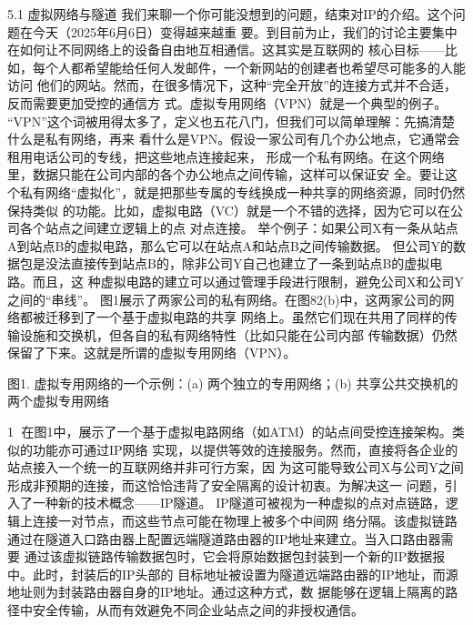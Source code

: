 
5.1 虚拟网络与隧道
我们来聊一个你可能没想到的问题，结束对IP的介绍。这个问题在今天（2025年6月6日）变得越来越重
要。到目前为止，我们的讨论主要集中在如何让不同网络上的设备自由地互相通信。这其实是互联网的
核心目标——比如，每个人都希望能给任何人发邮件，一个新网站的创建者也希望尽可能多的人能访问
他们的网站。然而，在很多情况下，这种“完全开放”的连接方式并不合适，反而需要更加受控的通信方
式。虚拟专用网络（VPN）就是一个典型的例子。
“VPN”这个词被用得太多了，定义也五花八门，但我们可以简单理解：先搞清楚什么是私有网络，再来
看什么是VPN。假设一家公司有几个办公地点，它通常会租用电话公司的专线，把这些地点连接起来，
形成一个私有网络。在这个网络里，数据只能在公司内部的各个办公地点之间传输，这样可以保证安
全。要让这个私有网络“虚拟化”，就是把那些专属的专线换成一种共享的网络资源，同时仍然保持类似
的功能。比如，虚拟电路（VC）就是一个不错的选择，因为它可以在公司各个站点之间建立逻辑上的点
对点连接。
举个例子：如果公司X有一条从站点A到站点B的虚拟电路，那么它可以在站点A和站点B之间传输数据。
但公司Y的数据包是没法直接传到站点B的，除非公司Y自己也建立了一条到站点B的虚拟电路。而且，这
种虚拟电路的建立可以通过管理手段进行限制，避免公司X和公司Y之间的“串线”。
图1展示了两家公司的私有网络。在图82(b)中，这两家公司的网络都被迁移到了一个基于虚拟电路的共享
网络上。虽然它们现在共用了同样的传输设施和交换机，但各自的私有网络特性（比如只能在公司内部
传输数据）仍然保留了下来。这就是所谓的虚拟专用网络（VPN）。




 图1. 虚拟专用网络的一个示例：(a) 两个独立的专用网络；(b) 共享公共交换机的两个虚拟专用网络

                                                      1
在图1中，展示了一个基于虚拟电路网络（如ATM）的站点间受控连接架构。类似的功能亦可通过IP网络
实现，以提供等效的连接服务。然而，直接将各企业的站点接入一个统一的互联网络并非可行方案，因
为这可能导致公司X与公司Y之间形成非预期的连接，而这恰恰违背了安全隔离的设计初衷。为解决这一
问题，引入了一种新的技术概念——IP隧道。
IP隧道可被视为一种虚拟的点对点链路，逻辑上连接一对节点，而这些节点可能在物理上被多个中间网
络分隔。该虚拟链路通过在隧道入口路由器上配置远端隧道路由器的IP地址来建立。当入口路由器需要
通过该虚拟链路传输数据包时，它会将原始数据包封装到一个新的IP数据报中。此时，封装后的IP头部的
目标地址被设置为隧道远端路由器的IP地址，而源地址则为封装路由器自身的IP地址。通过这种方式，数
据能够在逻辑上隔离的路径中安全传输，从而有效避免不同企业站点之间的非授权通信。




